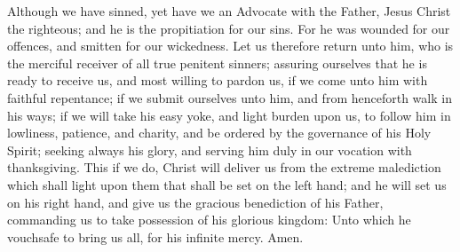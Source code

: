 Although we have sinned, yet have we an Advocate with the Father, Jesus Christ the righteous; and he is the propitiation for our sins. For he was wounded for our offences, and smitten for our wickedness. Let us therefore return unto him, who is the merciful receiver of all true penitent sinners; assuring ourselves that he is ready to receive us, and most willing to pardon us, if we come unto him with faithful repentance; if we submit ourselves unto him, and from henceforth walk in his ways; if we will take his easy yoke, and light burden upon us, to follow him in lowliness, patience, and charity, and be ordered by the governance of his Holy Spirit; seeking always his glory, and serving him duly in our vocation with thanksgiving. This if we do, Christ will deliver us from the extreme malediction which shall light upon them that shall be set on the left hand; and he will set us on his right hand, and give us the gracious benediction of his Father, commanding us to take possession of his glorious kingdom: Unto which he vouchsafe to bring us all, for his infinite mercy. Amen.


\medskip

